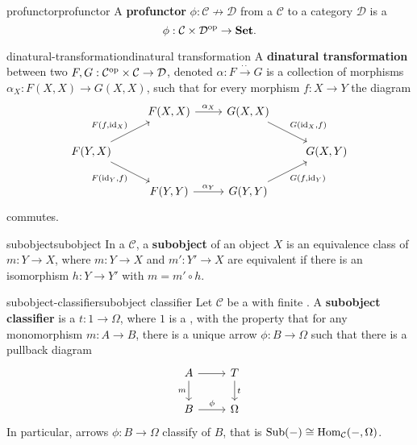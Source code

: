 \begin{topic}{profunctor}{profunctor}
    A \textbf{profunctor} $\phi : \mathcal{C} \nrightarrow \mathcal{D}$ from a  $\mathcal{C}$ to a category $\mathcal{D}$ is a 
    \[ \phi : \mathcal{C} \times \mathcal{D}^\textup{op} \to \textbf{Set} . \]
\end{topic}

\begin{topic}{dinatural-transformation}{dinatural transformation}
    A \textbf{dinatural transformation} between two  $F, G : \mathcal{C}^\textup{op} \times \mathcal{C} \to \mathcal{D}$, denoted $\alpha : F \xrightarrow{\cdot\cdot} G$ is a collection of morphisms $\alpha_X : F(X, X) \to G(X, X)$, such that for every morphism $f : X \to Y$ the diagram
    \[ \begin{tikzcd} & F(X, X) \arrow{r}{\alpha_X} & G(X, X) \arrow{dr}{G(\id_X, f)} & \\ F(Y, X) \arrow{ur}{F(f, \id_X)} \arrow[swap]{dr}{F(\id_Y, f)} & & & G(X, Y) \\ & F(Y, Y) \arrow{r}{\alpha_Y} & G(Y, Y) \arrow[swap]{ur}{G(f, \id_Y)} & \end{tikzcd} \]
    commutes.
\end{topic}

\begin{topic}{subobject}{subobject}
    In a  $\mathcal{C}$, a \textbf{subobject} of an object $X$ is an equivalence class of  $m : Y \to X$, where $m : Y \to X$ and $m' : Y' \to X$ are equivalent if there is an isomorphism $h : Y \to Y'$ with $m = m' \circ h$.
\end{topic}

\begin{topic}{subobject-classifier}{subobject classifier}
    Let $\mathcal{C}$ be a  with finite . A \textbf{subobject classifier} is a  $t : 1 \to \Omega$, where $1$ is a , with the property that for any monomorphism $m : A \to B$, there is a unique arrow $\phi : B \to \Omega$ such that there is a pullback diagram
    \[ \begin{tikzcd} A \arrow[swap]{d}{m} \arrow{r} & T \arrow{d}{t} \\ B \arrow{r}{\phi} & \Omega \end{tikzcd} \]
    In particular, arrows $\phi : B \to \Omega$ classify  of $B$, that is $\textup{Sub}(-) \cong \operatorname{Hom}_\mathcal{C}(-, \Omega)$.
\end{topic}

